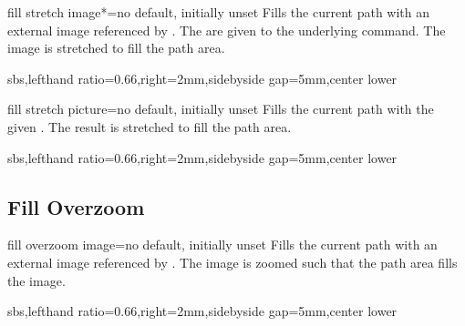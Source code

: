 \documentclass[a4paper,11pt]{article}
\begin{document}
\begin{docTikzKey}{fill stretch image*}{=}{no default, initially unset}
  Fills the current path with an external image referenced by .
  The  are given to the underlying  command.
  The image is stretched to fill the path area.
\begin{dispExample*}{sbs,lefthand ratio=0.66,right=2mm,sidebyside gap=5mm,center lower}
\end{dispExample*}
\end{docTikzKey}


\begin{docTikzKey}{fill stretch picture}{=}{no default, initially unset}
  Fills the current path with the given .
  The result is stretched to fill the path area.
\begin{dispExample*}{sbs,lefthand ratio=0.66,right=2mm,sidebyside gap=5mm,center lower}
\end{dispExample*}
\end{docTikzKey}


\clearpage
\subsection{Fill Overzoom}
\begin{docTikzKey}{fill overzoom image}{=}{no default, initially unset}
  Fills the current path with an external image referenced by .
  The image is zoomed such that the path area fills the image.
\begin{dispExample*}{sbs,lefthand ratio=0.66,right=2mm,sidebyside gap=5mm,center lower}
\end{dispExample*}
\end{docTikzKey}
\end{document}

